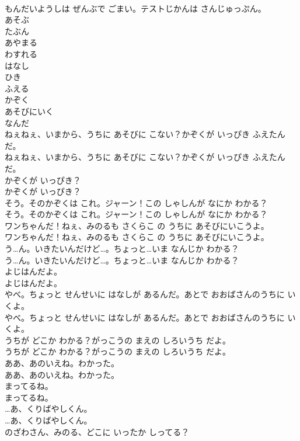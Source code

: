 \documentclass[8pt]{extreport}
\begin{document}
\begin{CJK}{UTF8}{min}
\\	もんだいようしは ぜんぶで ごまい。テストじかんは さんじゅっぷん。
\\	あそぶ
\\	たぶん
\\	あやまる
\\	わすれる
\\	はなし
\\	ひき
\\	ふえる
\\	かぞく
\\	あそびにいく
\\	なんだ
\\	ねぇねぇ、いまから、うちに あそびに こない？かぞくが いっぴき ふえたんだ。
\\	ねぇねぇ、いまから、うちに あそびに こない？かぞくが いっぴき ふえたんだ。
\\	かぞくが いっぴき？
\\	かぞくが いっぴき？
\\	そう。そのかぞくは これ。ジャーン！この しゃしんが なにか わかる？
\\	そう。そのかぞくは これ。ジャーン！この しゃしんが なにか わかる？
\\	ワンちゃんだ！ねぇ、みのるも さくらこ の うちに あそびにいこうよ。
\\	ワンちゃんだ！ねぇ、みのるも さくらこ の うちに あそびにいこうよ。
\\	う…ん。いきたいんだけど…。ちょっと…いま なんじか わかる？
\\	う…ん。いきたいんだけど…。ちょっと…いま なんじか わかる？
\\	よじはんだよ。
\\	よじはんだよ。
\\	やべ。ちょっと せんせいに はなしが あるんだ。あとで おおばさんのうちに いくよ。
\\	やべ。ちょっと せんせいに はなしが あるんだ。あとで おおばさんのうちに いくよ。
\\	うちが どこか わかる？がっこうの まえの しろいうち だよ。
\\	うちが どこか わかる？がっこうの まえの しろいうち だよ。
\\	ああ、あのいえね。わかった。
\\	ああ、あのいえね。わかった。
\\	まってるね。
\\	まってるね。
\\	…あ、くりばやしくん。
\\	…あ、くりばやしくん。
\\	のざわさん、みのる、どこに いったか しってる？

\end{CJK}
\end{document}
